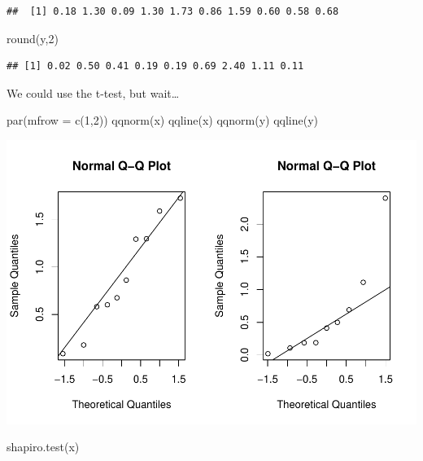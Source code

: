 \documentclass[
]{book}
\newenvironment{Shaded}{\begin{snugshade}}{\end{snugshade}}
\newcommand{\AttributeTok}[1]{\textcolor[rgb]{0.77,0.63,0.00}{#1}}
\newcommand{\DecValTok}[1]{\textcolor[rgb]{0.00,0.00,0.81}{#1}}
\newcommand{\FunctionTok}[1]{\textcolor[rgb]{0.00,0.00,0.00}{#1}}
\newcommand{\NormalTok}[1]{#1}
\begin{document}
\begin{verbatim}
##  [1] 0.18 1.30 0.09 1.30 1.73 0.86 1.59 0.60 0.58 0.68
\end{verbatim}

\begin{Shaded}
\begin{Highlighting}[]
\FunctionTok{round}\NormalTok{(y,}\DecValTok{2}\NormalTok{)}
\end{Highlighting}
\end{Shaded}

\begin{verbatim}
## [1] 0.02 0.50 0.41 0.19 0.19 0.69 2.40 1.11 0.11
\end{verbatim}

We could use the t-test, but wait\ldots{}

\begin{Shaded}
\begin{Highlighting}[]
\FunctionTok{par}\NormalTok{(}\AttributeTok{mfrow =} \FunctionTok{c}\NormalTok{(}\DecValTok{1}\NormalTok{,}\DecValTok{2}\NormalTok{))}
\FunctionTok{qqnorm}\NormalTok{(x)}
\FunctionTok{qqline}\NormalTok{(x)}
\FunctionTok{qqnorm}\NormalTok{(y)}
\FunctionTok{qqline}\NormalTok{(y)}
\end{Highlighting}
\end{Shaded}

\includegraphics{04-Non-Normal-Responses_files/figure-latex/unnamed-chunk-18-1.pdf}

\begin{Shaded}
\begin{Highlighting}[]
\FunctionTok{shapiro.test}\NormalTok{(x)}
\end{Highlighting}
\end{Shaded}
\end{document}
